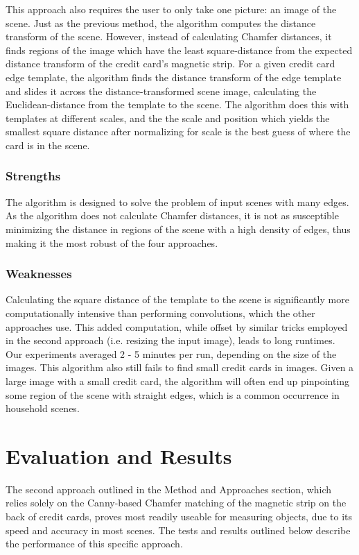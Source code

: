 \documentclass[10pt,twocolumn,letterpaper]{article}
\begin{document}
This approach also requires the user to only take one picture: an image of the scene. Just as the previous method, the algorithm computes the distance transform of the scene. However, instead of calculating Chamfer distances, it finds regions of the image which have the least square-distance from the expected distance transform of the credit card’s magnetic strip. For a given credit card edge template, the algorithm finds the distance transform of the edge template and slides it across the distance-transformed scene image, calculating the Euclidean-distance from the template to the scene. The algorithm does this with templates at different scales, and the the scale and position which yields the smallest square distance after normalizing for scale is the best guess of where the card is in the scene. 
\subsubsection{Strengths}

	The algorithm is designed to solve the problem of input scenes with many edges. As the algorithm does not calculate Chamfer distances, it is not as susceptible minimizing the distance in regions of the scene with a high density of edges, thus making it the most robust of the four approaches. 
\subsubsection{Weaknesses}

	Calculating the square distance of the template to the scene is significantly more computationally intensive than performing convolutions, which the other approaches use. This added computation, while offset by similar tricks employed in the second approach (i.e. resizing the input image), leads to long runtimes. Our experiments averaged 2 - 5 minutes per run, depending on the size of the images.
	This algorithm also still fails to find small credit cards in images. Given a large image with a small credit card, the algorithm will often end up pinpointing some region of the scene with straight edges, which is a common occurrence in household scenes. 
	
\section{Evaluation and Results}

The second approach outlined in the Method and Approaches section, which relies solely on the Canny-based Chamfer matching of the magnetic strip on the back of credit cards, proves most readily useable for measuring objects, due to its speed and accuracy in most scenes. The tests and results outlined below describe the performance of this specific approach. 
\end{document}
